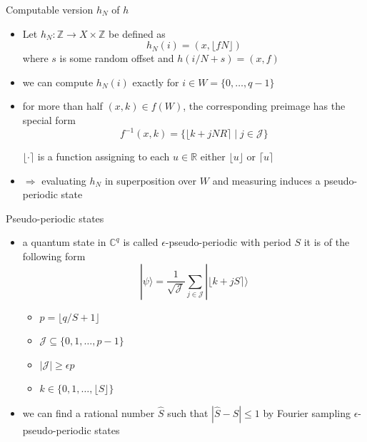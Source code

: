 \documentclass[slideColor]{prosper}
\renewcommand{\R}{\mathbb{R}}
\newcommand{\Z}{\mathbb{Z}}
\newcommand{\C}{\mathbb C}
\renewcommand{\>}{\rangle}
\newcommand{\<}{\langle}
\begin{document}
\begin{slide}{Computable version $h_N$ of $h$}

\vspace{-0.25cm}
\begin{itemize}
\item Let $h_N : \Z \rightarrow X \times \Z$ be defined as
\[
h_N(i) = (x,\lfloor f N \rfloor)
\]
where $s$ is some random offset and $h(i/N + s) = (x,f)$

\medskip
\item we can compute $h_N(i)$ exactly for $i\in W=\{0,\ldots,q-1\}$ 

\medskip
\item for more than half $(x,k) \in f(W)$, the corresponding preimage has the special form
\[
f^{-1}(x,k) = \{ \lfloor k + j N R \rceil \mid j \in \mathcal{J} \} 
\]

$\lfloor \cdot \rceil$ is a function assigning to each $u\in\R$ either $\lfloor u \rfloor$ or $\lceil u \rceil$

\medskip
\item $\Rightarrow$ evaluating $h_N$ in superposition over $W$ and measuring induces a pseudo-periodic state
\end{itemize}

\end{slide}


\begin{slide}{Pseudo-periodic states}
\vspace{-0.25cm}
\begin{itemize}
\item a quantum state in $\C^q$ is called $\epsilon$-pseudo-periodic with period $S$ it is of the following form
\[
|\psi\> = \frac{1}{\sqrt{\mathcal{J}}} \sum_{j\in\mathcal{J}} | \lfloor k + j S\rceil \>
\]
\begin{itemize}
\item $p=\lfloor q/S+1 \rfloor$

\medskip
\item $\mathcal{J}\subseteq\{0,1,\ldots,p-1\}$

\medskip
\item $|\mathcal{J}| \ge \epsilon p$

\medskip
\item $k\in\{0,1,\ldots,\lfloor S \rfloor\}$
\end{itemize}

\medskip
\item we can find a rational number $\hat{S}$ such that $|\hat{S}-S|\le 1$ by Fourier sampling $\epsilon$-pseudo-periodic states
\end{itemize}

\end{slide}
\end{document}
